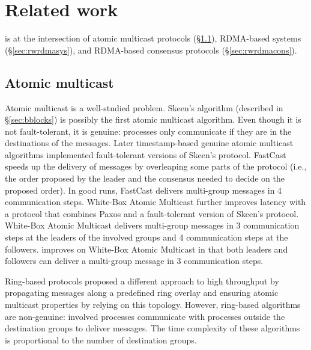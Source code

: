 \section{Related work}
\label{sec:related-work}

\libname is at the intersection of atomic multicast protocols (\S\ref{sec:rwamcast}), 
RDMA-based systems (\S\ref{sec:rwrdmasys}), and RDMA-based consensus protocols (\S\ref{sec:rwrdmacons}).


\subsection{Atomic multicast}
\label{sec:rwamcast}

Atomic multicast is a well-studied problem. Skeen's algorithm (described in \S\ref{sec:bblocks}) is possibly the first atomic multicast algorithm.
Even though it is not fault-tolerant, it
is genuine: processes only communicate if they are in the destinations of the messages. 
Later timestamp-based genuine atomic multicast algorithms 
implemented fault-tolerant versions of Skeen's protocol. 
FastCast \cite{Coelho2017} speeds up the delivery of messages by overleaping some parts of the protocol (i.e., the order proposed by the leader and the consensus needed to decide on the proposed order).
In good runs, FastCast delivers multi-group messages in 4 communication steps.
White-Box Atomic Multicast \cite{gotsman2019white} further improves 
latency with a protocol that combines Paxos and a fault-tolerant version of Skeen's protocol.
White-Box Atomic Multicast delivers multi-group messages in 3 communication steps at the leaders of the involved groups and 4 communication steps at the followers.
\libname improves on White-Box Atomic Multicast in that both leaders and followers can deliver a multi-group message in 3 communication steps.

Ring-based protocols \cite{delporte2000fault, bezerra2015ridge,
marandi2012multi} proposed a different approach to high throughput by
propagating messages along a predefined ring overlay and ensuring atomic multicast
properties by relying on this topology. However, ring-based algorithms are
non-genuine: involved processes communicate with processes outside the
destination groups to deliver messages. The time complexity of these algorithms is
proportional to the number of destination groups.


